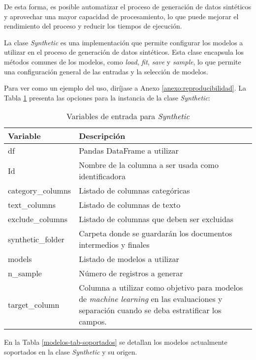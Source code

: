 De esta forma, es posible automatizar el proceso de generación de datos sintéticos y aprovechar una mayor capacidad de procesamiento, lo que puede mejorar el rendimiento del proceso y reducir los tiempos de ejecución.

La clase \emph{Synthetic} es una implementación que permite configurar los modelos a utilizar en el proceso de generación de datos sintéticos. Esta clase encapsula los métodos comunes de los modelos, como \emph{load}, \emph{fit}, \emph{save} y \emph{sample}, lo que permite una configuración general de las entradas y la selección de modelos.

Para ver como un ejemplo del uso, diríjase a Anexo \ref{anexo:reproducibilidad}.
\newpage
La Tabla \ref{synthetic-input} presenta las opciones para la instancia de la clase \emph{Synthetic}:

\begin{table}[H]
\centering
\caption{Variables de entrada para \emph{Synthetic}}
\label{synthetic-input}
\begin{tabular}{|l|m{25em}|}
\hline
\rowcolor[gray]{0.8}
\textbf{Variable} & \textbf{Descripción} \\
\hline
df & Pandas DataFrame a utilizar \\
\hline
Id & Nombre de la columna a ser usada como identificadora \\
\hline
category\_columns & Listado de columnas categóricas \\
\hline
text\_columns & Listado de columnas de texto \\
\hline
exclude\_columns & Listado de columnas que deben ser excluidas \\
\hline
synthetic\_folder & Carpeta donde se guardarán los documentos intermedios y finales \\
\hline
models & Listado de modelos a utilizar \\
\hline
n\_sample & Número de registros a generar \\
\hline
target\_column & Columna a utilizar como objetivo para modelos de \emph{machine learning} en las evaluaciones y separación cuando se deba estratificar los campos. \\
\hline
\end{tabular}
\end{table}

En la Tabla \ref{modelos-tab-soportados} se detallan los modelos actualmente soportados en la clase \emph{Synthetic} y su origen.

